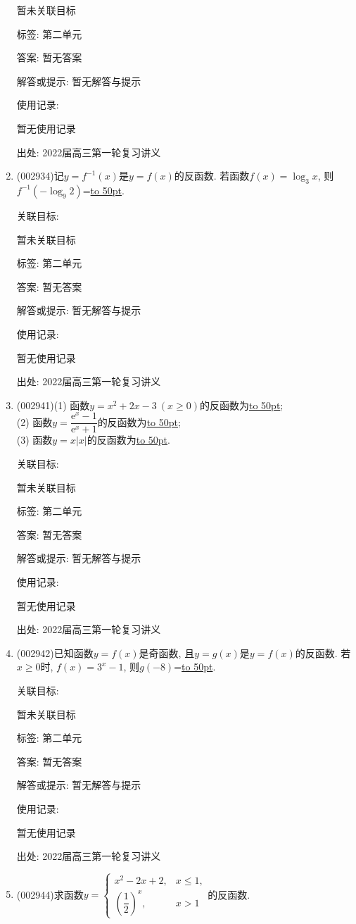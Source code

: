\documentclass[10pt,a4paper]{article}
\newcommand{\blank}[1]{\underline{\hbox to #1pt{}}}
\begin{document}
\begin{enumerate}[1.]
暂未关联目标



标签: 第二单元

答案: 暂无答案

解答或提示: 暂无解答与提示

使用记录:

暂无使用记录


出处: 2022届高三第一轮复习讲义
\item { (002934)}记$y=f^{-1}(x)$是$y=f(x)$的反函数. 若函数$f(x)=\log_3x$, 则$f^{-1}(-\log_9 2)$=\blank{50}.


关联目标:

暂未关联目标



标签: 第二单元

答案: 暂无答案

解答或提示: 暂无解答与提示

使用记录:

暂无使用记录


出处: 2022届高三第一轮复习讲义
\item { (002941)}(1) 函数$y=x^2+2x-3\ (x\ge 0)$的反函数为\blank{50};\\
(2) 函数$y=\dfrac{\mathrm{e}^x-1}{{\mathrm{e}}^x+1}$的反函数为\blank{50};\\
(3) 函数$y=x|x|$的反函数为\blank{50}.


关联目标:

暂未关联目标



标签: 第二单元

答案: 暂无答案

解答或提示: 暂无解答与提示

使用记录:

暂无使用记录


出处: 2022届高三第一轮复习讲义
\item { (002942)}已知函数$y=f(x)$是奇函数, 且$y=g(x)$是$y=f(x)$的反函数. 若$x\ge 0$时, $f(x)=3^x-1$, 则$g(-8)$=\blank{50}.


关联目标:

暂未关联目标



标签: 第二单元

答案: 暂无答案

解答或提示: 暂无解答与提示

使用记录:

暂无使用记录


出处: 2022届高三第一轮复习讲义
\item { (002944)}求函数$y=\begin{cases}x^2-2x+2, & x\le 1,\\(\dfrac 12)^x, & x>1  \end{cases}$的反函数.



\end{enumerate}
\end{document}
